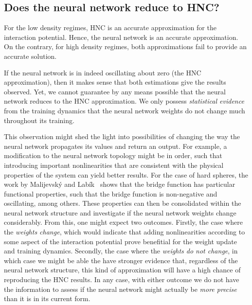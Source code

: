 \subsection{Does the neural network reduce to HNC?}
For the low density regimes, HNC is an accurate approximation for the interaction potential.
Hence, the neural network is an accurate approximation. On the contrary, for high density
regimes, both approximations fail to provide an accurate solution.

If the neural network is in indeed oscillating about zero (the HNC approximation), then
it makes sense that both estimations give the results observed. Yet, we cannot guarantee
by any means possible that the neural network reduces to the HNC approximation.
We only possess \emph{statistical evidence} from the training dynamics that the neural
network weights do not change much throughout its training.

This observation might shed the light into possibilities of changing the way the neural
network propagates its values and return an output. For example, a modification to the
neural network topology might be in order, such that introducing important 
nonlinearities that are consistent with the physical properties of the system can yield
better results. For the case of hard spheres, the work by Malijevský and Labík~\cite{malijevskyBridgeFunctionHard1987}
shows that the bridge function has particular functional properties, such that the
bridge function is non-negative and oscillating, among others. These properties can then
be consolidated within the neural network structure and investigate if the neural network 
weights change considerably.
From this, one might expect two outcomes. Firstly, the case where the \emph{weights change},
which would indicate that adding nonlinearities according to some aspect of the interaction 
potential prove benefitial for the weight update and training dynamics.
Secondly, the case where the \emph{weights do not change}, in which case we might
be able the have stronger evidence that, regardless of the neural network structure,
this kind of approximation will have a high chance of reproducing the HNC results.
In any case, with either outcome we do not have the information to assess if the neural
network might actually be \emph{more precise} than it is in its current form.

